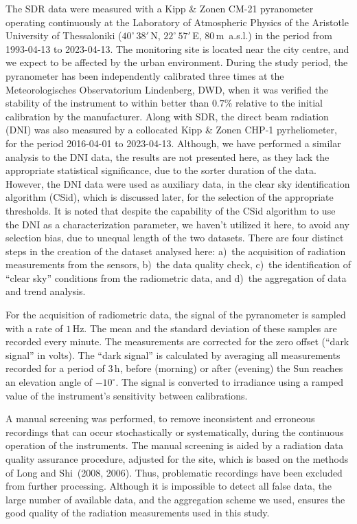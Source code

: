 \documentclass[
  preprint, 3p, authoryear]{article}
\begin{document}
The SDR data were measured with a Kipp \& Zonen CM-21 pyranometer operating continuously at the Laboratory of Atmospheric Physics of the Aristotle University of Thessaloniki
(\(40^\circ\,38'\,\)N, \(22^\circ\,57'\,\)E, \(80\,\)m~a.s.l.)
in the period from
1993-04-13
to
2023-04-13.
The monitoring site is located near the city centre, and we expect to be affected by the urban environment.
During the study period, the pyranometer has been independently calibrated three times at the Meteorologisches Observatorium Lindenberg, DWD, when it was verified the stability of the instrument to within better than \(0.7\%\) relative to the initial calibration by the manufacturer.
Along with SDR, the direct beam radiation (DNI) was also measured by a collocated Kipp \& Zonen CHP-1 pyrheliometer, for the period
2016-04-01
to
2023-04-13.
Although, we have performed a similar analysis to the DNI data, the results are not presented here, as they lack the appropriate statistical significance, due to the sorter duration of the data.
However, the DNI data were used as auxiliary data, in the clear sky identification algorithm (CSid), which is discussed later, for the selection of the appropriate thresholds.
It is noted that despite the capability of the CSid algorithm to use the DNI as a characterization parameter, we haven't utilized it here, to avoid any selection bias, due to unequal length of the two datasets.
There are four distinct steps in the creation of the dataset analysed here:
a)~the acquisition of radiation measurements from the sensors,
b)~the data quality check,
c)~the identification of ``clear sky'' conditions from the radiometric data, and
d)~the aggregation of data and trend analysis.

For the acquisition of radiometric data, the signal of the pyranometer is sampled with a rate of \(1\,\text{Hz}\).
The mean and the standard deviation of these samples are recorded every minute.
The measurements are corrected for the zero offset (``dark signal'' in volts).
The ``dark signal'' is calculated by averaging all measurements recorded for a period of
\(3\,\text{h}\),
before (morning) or after (evening) the Sun reaches an elevation angle of
\(-10^\circ\).
The signal is converted to irradiance using a ramped value of the instrument's sensitivity between calibrations.

A manual screening was performed, to remove inconsistent and erroneous recordings that can occur stochastically or systematically, during the continuous operation of the instruments.
The manual screening is aided by a radiation data quality assurance procedure, adjusted for the site, which is based on the methods of
Long and Shi~(2008, 2006).
Thus, problematic recordings have been excluded from further processing.
Although it is impossible to detect all false data, the large number of available data, and the aggregation scheme we used, ensures the good quality of the radiation measurements used in this study.
\end{document}
